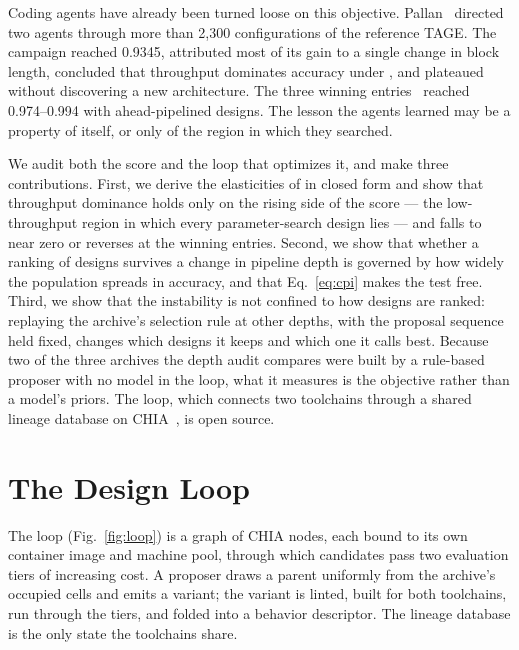 \documentclass[conference]{IEEEtran}
\newcommand{\vfs}{\text{VFS}}
\begin{document}
Coding agents have already been turned loose on this objective.
Pallan~\cite{pallan} directed two agents through more than 2,300 configurations
of the reference TAGE. The campaign reached 0.9345, attributed most of its gain
to a single change in block length, concluded that throughput dominates accuracy
under \vfs{}, and plateaued without discovering a new architecture. The three
winning entries~\cite{koizumi,fan,dang} reached 0.974--0.994 with
ahead-pipelined designs. The lesson the agents learned may be a property of
\vfs{} itself, or only of the region in which they searched.

We audit both the score and the loop that optimizes it, and make three
contributions. First, we derive the elasticities of \vfs{} in closed form and
show that throughput dominance holds only on the rising side of the score ---
the low-throughput region in which every parameter-search design lies --- and
falls to near zero or reverses at the winning entries. Second, we show that
whether a ranking of designs survives a change in pipeline depth is governed by
how widely the population spreads in accuracy, and that Eq.~\eqref{eq:cpi}
makes the test free.
Third, we show that the instability is not confined to how designs are ranked:
replaying the archive's selection rule at other depths, with the proposal
sequence held fixed, changes which designs it keeps and which one it calls
best. Because two of the three archives the depth audit compares
were built by a rule-based proposer with no model in the loop, what it measures
is the objective rather than a model's priors. The loop, which connects two
toolchains through a shared lineage database on CHIA~\cite{chia}, is open source.

\section{The Design Loop}
\label{sec:loop}

The loop (Fig.~\ref{fig:loop}) is a graph of CHIA nodes, each bound to its own
container image and machine pool, through which candidates pass two evaluation
tiers of increasing cost. A proposer draws a parent uniformly from the archive's occupied cells and
emits a variant; the variant is linted, built for both toolchains, run through
the tiers, and folded into a behavior descriptor. The lineage database is the
only state the toolchains share.
\end{document}
